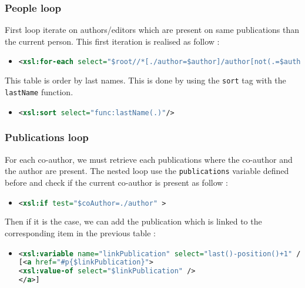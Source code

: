 \documentclass{article}
\begin{document}
    \subsubsection{People loop}
      First loop iterate on authors/editors which are present on same publications than the current person. This first iteration is realised as follow :
      \begin{itemize}
	\item \begin{lstlisting}[language=XML]
<xsl:for-each select="$root//*[./author=$author]/author[not(.=$author)]">\end{lstlisting}
      \end{itemize}
      This table is order by last names. This is done by using the \verb|sort| tag with the \verb|lastName| function.
      \begin{itemize}
	\item \begin{lstlisting}[language=XML]
<xsl:sort select="func:lastName(.)"/>\end{lstlisting}
      \end{itemize}
      
    \subsubsection{Publications loop}
      For each co-author, we must retrieve each publications where the co-author and the author are present. The nested loop use the \verb|publications| variable defined before and check if the current co-author is present as follow : 
      \begin{itemize}
	\item \begin{lstlisting}[language=XML]
<xsl:if test="$coAuthor=./author" >\end{lstlisting}
      \end{itemize}
      Then if it is the case, we can add the publication which is linked to the corresponding item in the previous table :
      \begin{itemize}
	\item \begin{lstlisting}[language=XML]
<xsl:variable name="linkPublication" select="last()-position()+1" />
[<a href="#p{$linkPublication}">
<xsl:value-of select="$linkPublication" />
</a>]\end{lstlisting}
      \end{itemize}
      
      
\end{document}
